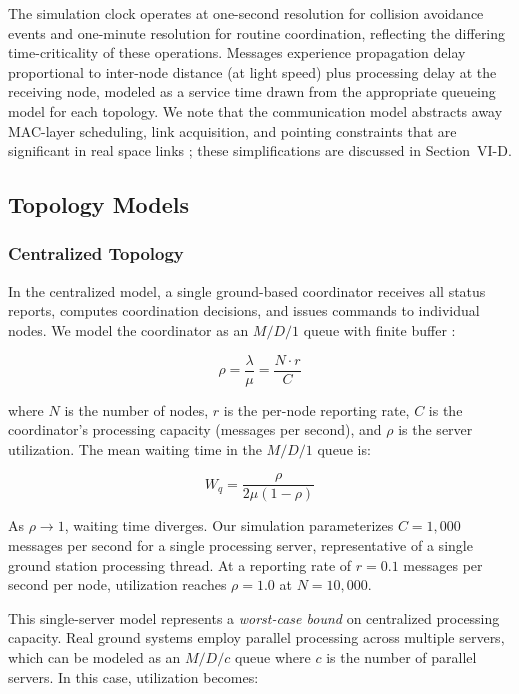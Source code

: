 \documentclass[journal]{IEEEtran}
\begin{document}
The simulation clock operates at one-second resolution for collision avoidance events and one-minute resolution for routine coordination, reflecting the differing time-criticality of these operations. Messages experience propagation delay proportional to inter-node distance (at light speed) plus processing delay at the receiving node, modeled as a service time drawn from the appropriate queueing model for each topology. We note that the communication model abstracts away MAC-layer scheduling, link acquisition, and pointing constraints that are significant in real space links \cite{ccsds_prox1}; these simplifications are discussed in Section~VI-D.

\subsection{Topology Models}

\subsubsection{Centralized Topology}

In the centralized model, a single ground-based coordinator receives all status reports, computes coordination decisions, and issues commands to individual nodes. We model the coordinator as an $M/D/1$ queue with finite buffer \cite{kleinrock_queueing}:

\begin{equation}
    \rho = \frac{\lambda}{\mu} = \frac{N \cdot r}{C}
    \label{eq:centralized_utilization}
\end{equation}

\noindent where $N$ is the number of nodes, $r$ is the per-node reporting rate, $C$ is the coordinator's processing capacity (messages per second), and $\rho$ is the server utilization. The mean waiting time in the $M/D/1$ queue is:

\begin{equation}
    W_q = \frac{\rho}{2\mu(1 - \rho)}
    \label{eq:md1_waiting}
\end{equation}

As $\rho \to 1$, waiting time diverges. Our simulation parameterizes $C = 1{,}000$ messages per second for a single processing server, representative of a single ground station processing thread. At a reporting rate of $r = 0.1$ messages per second per node, utilization reaches $\rho = 1.0$ at $N = 10{,}000$.

This single-server model represents a \emph{worst-case bound} on centralized processing capacity. Real ground systems employ parallel processing across multiple servers, which can be modeled as an $M/D/c$ queue where $c$ is the number of parallel servers. In this case, utilization becomes:
\end{document}
